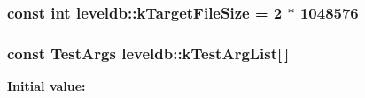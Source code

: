 \hypertarget{namespaceleveldb_aa8eab3a12c3da0efefd9fe53f904440b}{
\subsubsection[{k\-Target\-File\-Size}]{\setlength{\rightskip}{0pt plus 5cm}const int leveldb\-::k\-Target\-File\-Size = 2 $\ast$ 1048576\hspace{0.3cm}{\ttfamily [static]}}}\label{namespaceleveldb_aa8eab3a12c3da0efefd9fe53f904440b}
\hypertarget{namespaceleveldb_a6d7e1fb11fbc0e83ef27e87007c8a425}{
\subsubsection[{k\-Test\-Arg\-List}]{\setlength{\rightskip}{0pt plus 5cm}const {\bf Test\-Args} leveldb\-::k\-Test\-Arg\-List\mbox{[}$\,$\mbox{]}\hspace{0.3cm}{\ttfamily [static]}}}\label{namespaceleveldb_a6d7e1fb11fbc0e83ef27e87007c8a425}
{\bfseries Initial value\-:}
